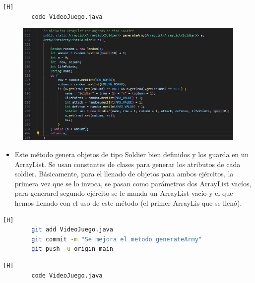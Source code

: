 \documentclass{article}
\begin{document}
	
	
	\begin{lstlisting}[language=bash,caption={Se mejora el método que permite iniciliazar los ArrayList con objetos de tipo soldier. }][H]
		code VideoJuego.java
	\end{lstlisting}
	
	\begin{figure}[H]
		\centering
		\includegraphics[width=1\textwidth,keepaspectratio]{img/generateArmy.jpg}
	\end{figure}
	
	
	\begin{itemize}	
		\item Este método genera objetos de tipo Soldier bien definidos y los guarda en un ArrayList. Se usan constantes de clases para generar los atributos de cada soldier. Básicamente, para el llenado de objetos para ambos ejércitos, la primera vez que se lo invoca, se pasan como parámetros dos ArrayList vacíos, para generarel segundo ejército se le manda un ArrayList vacío y el que hemos llenado con el uso de este método (el primer ArrayLis que se llenó). 
	\end{itemize}
	
	\begin{lstlisting}[language=bash,caption={Commit: d4f69f7ac1e9eaddbdca6dae2b5b253ebfcce269}][H]
		git add VideoJuego.java
		git commit -m "Se mejora el metodo generateArmy"			
		git push -u origin main
	\end{lstlisting}	
	
	
	
	
	
	\begin{lstlisting}[language=bash,caption={Se hacen cambios en el método myBoard }][H]
		code VideoJuego.java
	\end{lstlisting}
	
\end{document}
